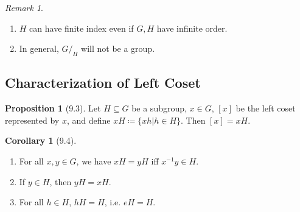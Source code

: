 \documentclass{article}
\newcommand{\coleq}{\coloneqq}
\newcommand{\inverse}[1]{#1^{-1}}
\theoremstyle{definition}
\newtheorem*{cor}{Corollary}
\newtheorem*{prop}{Proposition}
\theoremstyle{remark}
\newtheorem*{rmk}{Remark}
\begin{document}
{{            \begin{rmk}\hfill
                \begin{enumerate}
                    \item $H$ can have finite index even if $G,H$ have infinite order.
                    \item In general, $G/_H$ will not be a group.
                \end{enumerate}
            \end{rmk}
            
        \subsection*{Characterization of Left Coset}
            \begin{prop}[9.3]
                Let $H \subseteq G$ be a subgroup, $x \in G$, $[x]$ be the left coset represented by $x$, and define $xH \coleq \{xh|h\in H\}$. Then $[x]=xH$.
            \end{prop}
            
            \begin{cor}[9.4]\hfill
                \begin{enumerate}
                    \item For all $x,y \in G$, we have $xH=yH$ iff $\inverse{x}y\in H$.
                    \item If $y\in H$, then $yH=xH$.
                    \item For all $h\in H$, $hH=H$, i.e. $eH=H$.
                \end{enumerate}
            \end{cor}
        }
    }
    
\end{document}
